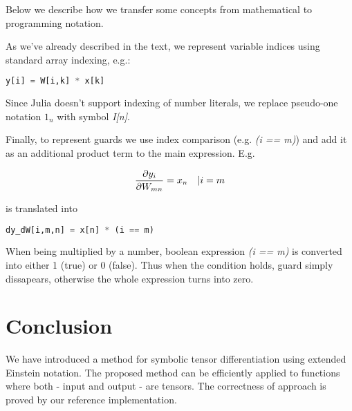\documentclass[conference]{IEEEtran}
\begin{document}
Below we describe how we transfer some concepts from mathematical to
programming notation.

As we've already described in the text, we represent variable indices
using standard array indexing, e.g.:

\begin{lstlisting}[language=Python]
  y[i] = W[i,k] * x[k]
\end{lstlisting}

Since Julia doesn't support indexing of number literals, we replace
pseudo-one notation $1_n$ with symbol \textit{I[n]}.

Finally, to represent guards we use index comparison (e.g. \textit{(i
  == m)}) and add it as an additional product term to the main
expression. E.g.

$$\pdv{y_i}{W_{mn}} = x_n \quad | i = m$$

is translated into

\begin{lstlisting}[language=Python]
  dy_dW[i,m,n] = x[n] * (i == m)
\end{lstlisting}

When being multiplied by a number, boolean expression \textit{(i ==
  m)} is converted into either 1 (true) or 0 (false). Thus when the
condition holds, guard simply dissapears, otherwise the whole
expression turns into zero.

\section{Conclusion}

We have introduced a method for symbolic tensor differentiation using
extended Einstein notation. The proposed method can be efficiently
applied to functions where both - input and output - are tensors. The
correctness of approach is proved by our reference implementation.


\newpage

 



\end{document}
